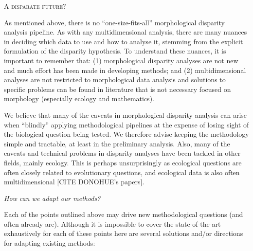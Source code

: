 \documentclass[12pt,letterpaper]{article}
\renewcommand{\section}[1]{%
\bigskip
\begin{center}
\begin{Large}
\normalfont\scshape #1
\medskip
\end{Large}
\end{center}}
\renewcommand{\subsection}[1]{%
\bigskip
\begin{center}
\begin{large}
\normalfont\itshape #1
\end{large}
\end{center}}
\begin{document}
\section{A disparate future?}

As mentioned above, there is no ``one-size-fits-all'' morphological disparity analysis pipeline.
As with any multidimensional analysis, there are many nuances in deciding which data to use and how to analyse it, stemming from the explicit formulation of the disparity hypothesis.
To understand these nuances, it is important to remember that: (1) morphological disparity analyses are not new and much effort has been made in developing methods; and (2) multidimensional analyses are not restricted to morphological data analysis and solutions to specific problems can be found in literature that is not necessary focused on morphology (especially ecology and mathematics).

We believe that many of the caveats in morphological disparity analysis can arise when ``blindly'' applying methodological pipelines at the expense of losing sight of the  biological question being tested.
We therefore advise keeping the methodology simple and tractable, at least in the preliminary analysis.
Also, many of the caveats and technical problems in disparity analyses have been tackled in other fields, mainly ecology.
This is perhaps unsurprisingly as ecological questions are often closely related to evolutionary questions, and ecological data is also often multidimensional [CITE DONOHUE's papers].

    


\subsection{How can we adapt our methods?}
Each of the points outlined above may drive new methodological questions (and often already are).
Although it is impossible to cover the state-of-the-art exhaustively for each of these points here are several solutions and/or directions for adapting existing methods:
\end{document}
